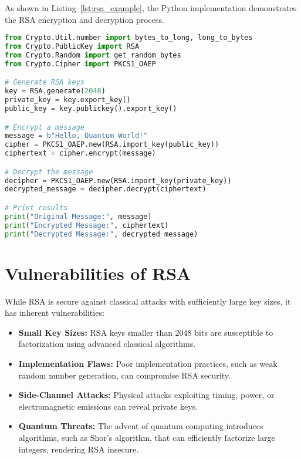 \documentclass[12pt,a4paper]{report}
\begin{document}
As shown in Listing~\ref{lst:rsa_example}, the Python implementation demonstrates the RSA encryption and decryption process.

\begin{lstlisting}[language=Python, caption=Python code for RSA encryption and decryption, label={lst:rsa_example}]
from Crypto.Util.number import bytes_to_long, long_to_bytes
from Crypto.PublicKey import RSA
from Crypto.Random import get_random_bytes
from Crypto.Cipher import PKCS1_OAEP

# Generate RSA keys
key = RSA.generate(2048)
private_key = key.export_key()
public_key = key.publickey().export_key()

# Encrypt a message
message = b"Hello, Quantum World!"
cipher = PKCS1_OAEP.new(RSA.import_key(public_key))
ciphertext = cipher.encrypt(message)

# Decrypt the message
decipher = PKCS1_OAEP.new(RSA.import_key(private_key))
decrypted_message = decipher.decrypt(ciphertext)

# Print results
print("Original Message:", message)
print("Encrypted Message:", ciphertext)
print("Decrypted Message:", decrypted_message)
\end{lstlisting}

\section{Vulnerabilities of RSA}
While RSA is secure against classical attacks with sufficiently large key sizes, it has inherent vulnerabilities:
\begin{itemize}
    \item \textbf{Small Key Sizes:} RSA keys smaller than 2048 bits are susceptible to factorization using advanced classical algorithms.
    \item \textbf{Implementation Flaws:} Poor implementation practices, such as weak random number generation, can compromise RSA security.
    \item \textbf{Side-Channel Attacks:} Physical attacks exploiting timing, power, or electromagnetic emissions can reveal private keys.
    \item \textbf{Quantum Threats:} The advent of quantum computing introduces algorithms, such as Shor's algorithm, that can efficiently factorize large integers, rendering RSA insecure.
\end{itemize}
\end{document}
